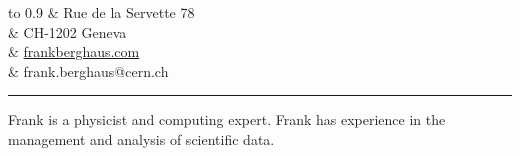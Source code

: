 \documentclass[12pt,a4paper]{article}
\newcommand{\colorrule}[1]
{
  {\color{#1}\hrule height 2pt}
  \vspace{1.0em}
}
\begin{document}
\begin{center}
	\begin{tabu} to 0.9\textwidth {X[l] X[r]}
		                                      & {\small Rue de la Servette 78} \\
																          & {\small CH-1202 Geneva} \\
																          & \href{http://www.frankberghaus.com}{\small frankberghaus.com} \\
	                                    		& {\small frank.berghaus@cern.ch} \\
	\end{tabu}
\end{center}
\colorrule{NavyBlue}
Frank is a physicist and computing expert. Frank has experience in the management and analysis of scientific data.
\end{document}
